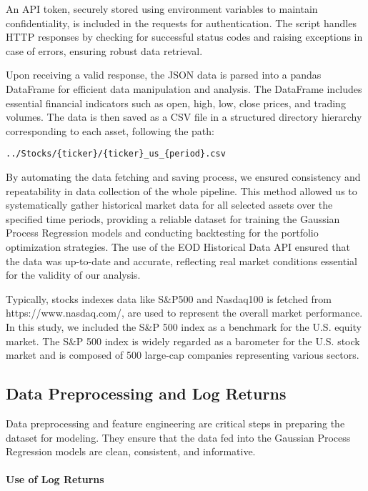 An API token, securely stored using environment variables to maintain confidentiality, is included in the requests for authentication. The script handles HTTP responses by checking for successful status codes and raising exceptions in case of errors, ensuring robust data retrieval.

Upon receiving a valid response, the JSON data is parsed into a pandas DataFrame for efficient data manipulation and analysis. The DataFrame includes essential financial indicators such as open, high, low, close prices, and trading volumes. The data is then saved as a CSV file in a structured directory hierarchy corresponding to each asset, following the path:

\begin{verbatim}
../Stocks/{ticker}/{ticker}_us_{period}.csv
\end{verbatim}

By automating the data fetching and saving process, we ensured consistency and repeatability in data collection of the whole pipeline. This method allowed us to systematically gather historical market data for all selected assets over the specified time periods, providing a reliable dataset for training the Gaussian Process Regression models and conducting backtesting for the portfolio optimization strategies. The use of the EOD Historical Data API ensured that the data was up-to-date and accurate, reflecting real market conditions essential for the validity of our analysis.

Typically, stocks indexes data like S\&P500 and Nasdaq100 is fetched from https://www.nasdaq.com/, are used to represent the overall market performance. In this study, we included the S\&P 500 index as a benchmark for the U.S. equity market. The S\&P 500 index is widely regarded as a barometer for the U.S. stock market and is composed of 500 large-cap companies representing various sectors.

\subsection{Data Preprocessing and Log Returns}
Data preprocessing and feature engineering are critical steps in preparing the dataset for modeling. They ensure that the data fed into the Gaussian Process Regression models are clean, consistent, and informative.

\paragraph{Use of Log Returns}

